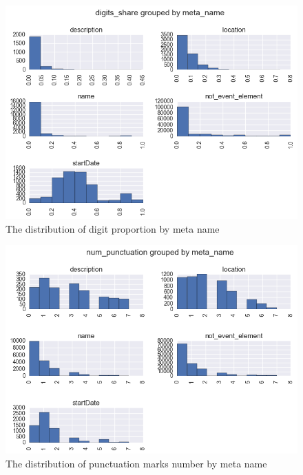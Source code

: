 \begin{figure}[h]
\begin{center}
\includegraphics[width=1.0\textwidth]{figures/distrDigitPropByMeta}
\caption{The distribution of digit proportion by meta name}
\label{fig:distrDigitPropByMeta}
\end{center}
\end{figure}

\begin{figure}[h]
\begin{center}
\includegraphics[width=1.0\textwidth]{figures/distrPunctByMeta}
\caption{The distribution of punctuation marks number by meta name}
\label{fig:distrPunctByMeta}
\end{center}
\end{figure}


